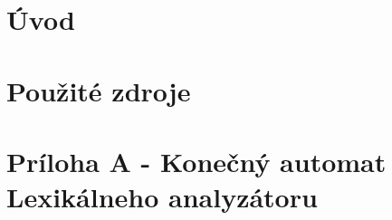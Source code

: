 \documentclass[a4paper, 11pt]{article}
\begin{document}
\tableofcontents
\newpage

\section{Úvod}
\newpage

\section{Použité zdroje}
\newpage

\section{Príloha A - Konečný automat Lexikálneho analyzátoru}
\newpage

\end{document}

